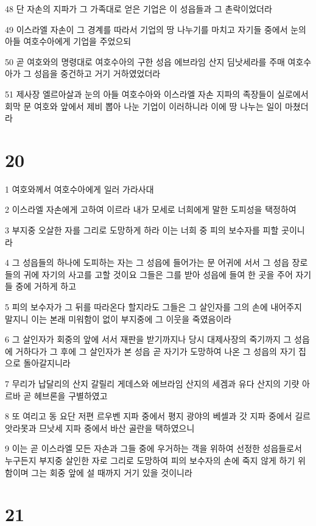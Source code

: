 \par 48 단 자손의 지파가 그 가족대로 얻은 기업은 이 성읍들과 그 촌락이었더라
\par 49 이스라엘 자손이 그 경계를 따라서 기업의 땅 나누기를 마치고 자기들 중에서 눈의 아들 여호수아에게 기업을 주었으되
\par 50 곧 여호와의 명령대로 여호수아의 구한 성읍 에브라임 산지 딤낫세라를 주매 여호수아가 그 성읍을 중건하고 거기 거하였었더라
\par 51 제사장 엘르아살과 눈의 아들 여호수아와 이스라엘 자손 지파의 족장들이 실로에서 회막 문 여호와 앞에서 제비 뽑아 나눈 기업이 이러하니라 이에 땅 나누는 일이 마쳤더라

\chapter{20}

\par 1 여호와께서 여호수아에게 일러 가라사대
\par 2 이스라엘 자손에게 고하여 이르라 내가 모세로 너희에게 말한 도피성을 택정하여
\par 3 부지중 오살한 자를 그리로 도망하게 하라 이는 너희 중 피의 보수자를 피할 곳이니라
\par 4 그 성읍들의 하나에 도피하는 자는 그 성읍에 들어가는 문 어귀에 서서 그 성읍 장로들의 귀에 자기의 사고를 고할 것이요 그들은 그를 받아 성읍에 들여 한 곳을 주어 자기들 중에 거하게 하고
\par 5 피의 보수자가 그 뒤를 따라온다 할지라도 그들은 그 살인자를 그의 손에 내어주지 말지니 이는 본래 미워함이 없이 부지중에 그 이웃을 죽였음이라
\par 6 그 살인자가 회중의 앞에 서서 재판을 받기까지나 당시 대제사장의 죽기까지 그 성읍에 거하다가 그 후에 그 살인자가 본 성읍 곧 자기가 도망하여 나온 그 성읍의 자기 집으로 돌아갈지니라
\par 7 무리가 납달리의 산지 갈릴리 게데스와 에브라임 산지의 세겜과 유다 산지의 기럇 아르바 곧 헤브론을 구별하였고
\par 8 또 여리고 동 요단 저편 르우벤 지파 중에서 평지 광야의 베셀과 갓 지파 중에서 길르앗라못과 므낫세 지파 중에서 바산 골란을 택하였으니
\par 9 이는 곧 이스라엘 모든 자손과 그들 중에 우거하는 객을 위하여 선정한 성읍들로서 누구든지 부지중 살인한 자로 그리로 도망하여 피의 보수자의 손에 죽지 않게 하기 위함이며 그는 회중 앞에 설 때까지 거기 있을 것이니라

\chapter{21}

